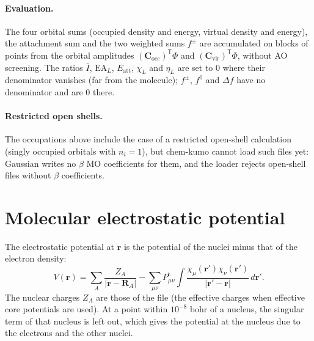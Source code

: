 \documentclass[11pt,a4paper]{article}
\begin{document}
\paragraph{Evaluation.} The four orbital sums (occupied density and
energy, virtual density and energy), the attachment sum and the two
weighted sums $f^\pm$ are accumulated on blocks of points from the orbital
amplitudes $(\mathbf C_{\mathrm{occ}})^{\mathsf T}\Phi$ and
$(\mathbf C_{\mathrm{vir}})^{\mathsf T}\Phi$, without AO screening. The
ratios $\bar I$, $\mathrm{EA}_L$, $E_{\mathrm{att}}$, $\chi_L$ and
$\eta_L$ are set to 0 where their denominator vanishes (far from the
molecule); $f^\pm$, $f^0$ and $\Delta f$ have no denominator and are 0
there.

\paragraph{Restricted open shells.} The occupations above include the case
of a restricted open-shell calculation (singly occupied orbitals with
$n_i=1$), but chem-kumo cannot load such files yet: Gaussian writes no
$\beta$ MO coefficients for them, and the loader rejects open-shell files
without $\beta$ coefficients.

\section{Molecular electrostatic potential}\label{sec:esp}

The electrostatic potential at $\mathbf r$ is the potential of the nuclei
minus that of the electron density:
\begin{equation}
 V(\mathbf r)=\sum_A\frac{Z_A}{|\mathbf r-\mathbf R_A|}
 -\sum_{\mu\nu}P^{\mathrm t}_{\mu\nu}\int\frac{\chi_\mu(\mathbf r')\chi_\nu(\mathbf r')}
 {|\mathbf r'-\mathbf r|}\,d\mathbf r'.
\end{equation}
The nuclear charges $Z_A$ are those of the file (the effective charges when
effective core potentials are used). At a point within $10^{-8}$ bohr of a
nucleus, the singular term of that nucleus is left out, which gives the
potential at the nucleus due to the electrons and the other nuclei.
\end{document}
